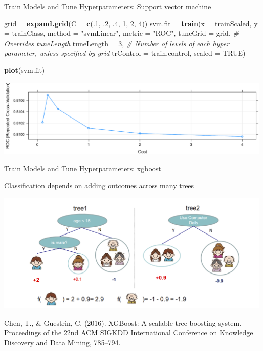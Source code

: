 \documentclass[ignorenonframetext,]{beamer}
\newenvironment{Shaded}{\begin{snugshade}}{\end{snugshade}}
\newcommand{\KeywordTok}[1]{\textcolor[rgb]{0.13,0.29,0.53}{\textbf{#1}}}
\newcommand{\DataTypeTok}[1]{\textcolor[rgb]{0.13,0.29,0.53}{#1}}
\newcommand{\DecValTok}[1]{\textcolor[rgb]{0.00,0.00,0.81}{#1}}
\newcommand{\StringTok}[1]{\textcolor[rgb]{0.31,0.60,0.02}{#1}}
\newcommand{\CommentTok}[1]{\textcolor[rgb]{0.56,0.35,0.01}{\textit{#1}}}
\newcommand{\OtherTok}[1]{\textcolor[rgb]{0.56,0.35,0.01}{#1}}
\newcommand{\NormalTok}[1]{#1}
\begin{document}
\begin{frame}[fragile]{Train Models and Tune Hyperparameters: Support
vector machine}

\begin{Shaded}
\begin{Highlighting}[]
\NormalTok{grid =}\StringTok{ }\KeywordTok{expand.grid}\NormalTok{(}\DataTypeTok{C =} \KeywordTok{c}\NormalTok{(.}\DecValTok{1}\NormalTok{, .}\DecValTok{2}\NormalTok{, .}\DecValTok{4}\NormalTok{, }\DecValTok{1}\NormalTok{, }\DecValTok{2}\NormalTok{, }\DecValTok{4}\NormalTok{))}
\NormalTok{svm.fit =}\StringTok{  }\KeywordTok{train}\NormalTok{(}\DataTypeTok{x =}\NormalTok{ trainScaled, }\DataTypeTok{y =}\NormalTok{ trainClass,}
  \DataTypeTok{method =} \StringTok{"svmLinear"}\NormalTok{, }\DataTypeTok{metric =} \StringTok{"ROC"}\NormalTok{,}
  \DataTypeTok{tuneGrid =}\NormalTok{ grid, }\CommentTok{# Overrides tuneLength}
  \DataTypeTok{tuneLength =} \DecValTok{3}\NormalTok{, }\CommentTok{# Number of levels of each hyper parameter, unless specified by grid}
  \DataTypeTok{trControl =}\NormalTok{ train.control, }\DataTypeTok{scaled =} \OtherTok{TRUE}\NormalTok{)}

\KeywordTok{plot}\NormalTok{(svm.fit)}
\end{Highlighting}
\end{Shaded}

\includegraphics{ML_with_caret_files/figure-beamer/train_svm-1.pdf}

\end{frame}

\begin{frame}{Train Models and Tune Hyperparameters: xgboost}

Classification depends on adding outcomes across many trees

\includegraphics[width=0.85\linewidth]{xgboost_trees}

{Chen, T., \& Guestrin, C. (2016). XGBoost: A scalable tree boosting
system. Proceedings of the 22nd ACM SIGKDD International Conference on
Knowledge Discovery and Data Mining, 785--794.}

\end{frame}
\end{document}
